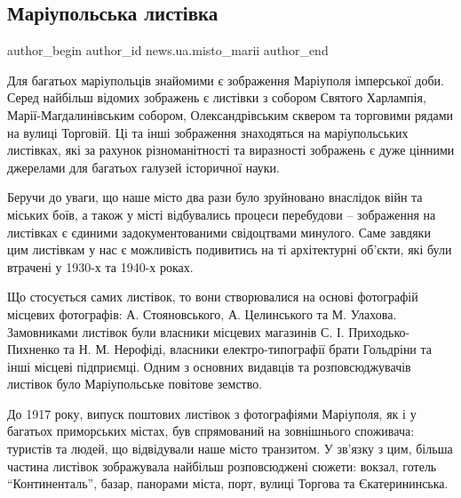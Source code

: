  
 
 
 
 
 
\subsection{Маріупольська листівка}
\label{sec:30_08_2023.stz.news.ua.misto_marii.1.mariupolska_lystivka}
 
\ifcmt
 author_begin
   author_id news.ua.misto_marii
 author_end
\fi

Для багатьох маріупольців знайомими є зображення Маріуполя імперської доби.
Серед найбільш відомих зображень є листівки з собором Святого Харлампія,
Марії-Магдалинівським собором, Олександрівським сквером та торговими рядами на
вулиці Торговій. Ці та інші зображення знаходяться на маріупольських листівках,
які за рахунок різноманітності та виразності зображень є дуже цінними джерелами
для багатьох галузей історичної науки.

Беручи до уваги, що наше місто два рази було зруйновано внаслідок війн та
міських боїв, а також у місті відбувались процеси перебудови – зображення на
листівках є єдиними задокументованими свідоцтвами минулого. Саме завдяки цим
листівкам у нас є можливість подивитись на ті архітектурні об'єкти, які були
втрачені у 1930-х та 1940-х роках.


Що стосується самих листівок, то вони створювалися на основі фотографій
місцевих фотографів: А. Стояновського, А. Целинського та М. Улахова.
Замовниками листівок були власники місцевих магазинів С. І. Приходько-Пихненко
та Н. М. Нерофіді, власники електро-типографії брати Гольдріни та інші місцеві
підприємці. Одним з основних видавців та розповсюджувачів листівок було
Маріупольське повітове земство.


До 1917 року, випуск поштових листівок з фотографіями Маріуполя, як і у
багатьох приморських містах, був спрямований на зовнішнього споживача: туристів
та людей, що відвідували наше місто транзитом. У зв'язку з цим, більша частина
листівок зображувала найбільш розповсюджені сюжети: вокзал, готель
\enquote{Континенталь}, базар, панорами міста, порт, вулиці Торгова та Єкатерининська.

